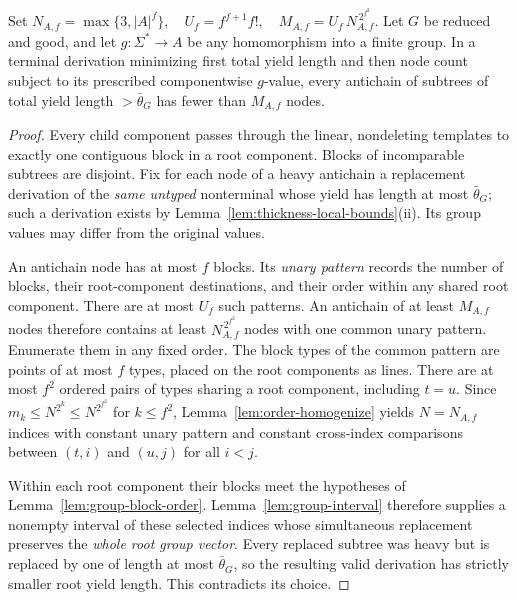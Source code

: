 \begin{lemma}
\label{lem:group-heavy-antichain}
Set
\(N_{A,f}=\max\{3,|A|^f\},\quad
 U_f=f^{f+1}f!,\quad
 M_{A,f}=U_f\,N_{A,f}^{\,2^{f^2}}\).
Let $G$ be reduced and good, and let $g:\Sigma^*\to A$
be any homomorphism into a finite group.  In a terminal
derivation minimizing first total yield length and then
node count subject to its prescribed componentwise
$g$-value, every antichain of subtrees of total yield
length $>\bar\theta_G$ has fewer than $M_{A,f}$ nodes.
\end{lemma}
\begin{proof}
Every child component passes through the linear,
nondeleting templates to exactly one contiguous block
in a root component.  Blocks of incomparable subtrees
are disjoint.  Fix for each node of a heavy antichain
a replacement derivation of the \emph{same untyped}
nonterminal whose yield has length at most
$\bar\theta_G$; such a derivation exists by
Lemma~\ref{lem:thickness-local-bounds}(ii).
Its group values may differ from the original values.

An antichain node has at most $f$ blocks.  Its
\emph{unary pattern} records the number of blocks,
their root-component destinations, and their order
within any shared root component.  There are at
most $U_f$ such patterns.  An antichain of at least
$M_{A,f}$ nodes therefore contains at least
$N_{A,f}^{\,2^{f^2}}$ nodes with one common unary
pattern.  Enumerate them in any fixed order.  The block
types of the common pattern are points of at most $f$
types, placed on the root components as lines.  There
are at most $f^2$ ordered pairs of types sharing a root
component, including $t=u$.  Since
$m_k\le N^{2^k}\le N^{2^{f^2}}$ for $k\le f^2$,
Lemma~\ref{lem:order-homogenize} yields $N=N_{A,f}$
indices with constant unary pattern and constant
cross-index comparisons between $(t,i)$ and $(u,j)$
for all $i<j$.

Within each root component their blocks meet
the hypotheses of
Lemma~\ref{lem:group-block-order}.
Lemma~\ref{lem:group-interval} therefore supplies
a nonempty interval of these selected indices
whose simultaneous replacement preserves the
\emph{whole root group vector}.  Every replaced
subtree was heavy but is replaced by one of length
at most $\bar\theta_G$, so the resulting valid
derivation has strictly smaller root yield length.
This contradicts its choice.
\end{proof}

